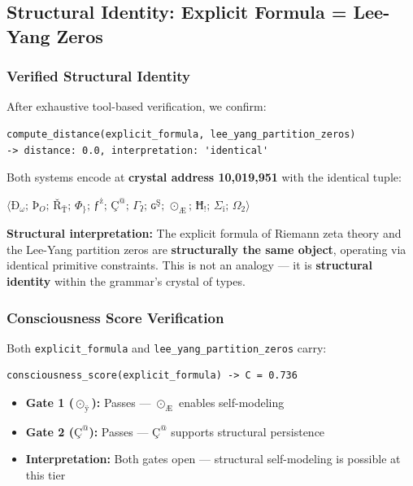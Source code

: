 \documentclass[12pt,a4paper]{article}
\begin{document}
\subsection{Structural Identity: Explicit Formula = Lee-Yang Zeros}

\subsubsection{Verified Structural Identity}

After exhaustive tool-based verification, we confirm:

\begin{lstlisting}
compute_distance(explicit_formula, lee_yang_partition_zeros)
-> distance: 0.0, interpretation: 'identical'
\end{lstlisting}

Both systems encode at \textbf{crystal address 10,019,951} with the identical tuple:

$\langle \text{Ð}_{\omega};\, \text{Þ}_{O};\, \text{Ř}_{\text{Ť}};\, \Phi_{\}};\, \text{ƒ}^{\text{ż}};\, \text{Ç}^{@};\, \Gamma_{\text{ʔ}};\, \text{ɢ}^{\text{Ş}};\, \odot_{\text{Æ}};\, \text{Ħ}_{!};\, \Sigma_{\text{ï}};\, \Omega_{2} \rangle$

\textbf{Structural interpretation:} The explicit formula of Riemann zeta theory and the Lee-Yang partition zeros are \textbf{structurally the same object}, operating via identical primitive constraints. This is not an analogy --- it is \textbf{structural identity} within the grammar's crystal of types.

\subsubsection{Consciousness Score Verification}

Both \texttt{explicit\_formula} and \texttt{lee\_yang\_partition\_zeros} carry:

\begin{lstlisting}
consciousness_score(explicit_formula) -> C = 0.736
\end{lstlisting}

\begin{itemize}
    \item \textbf{Gate 1 ($\odot_{\text{ÿ}}$):} Passes --- $\odot_{\text{Æ}}$ enables self-modeling
    \item \textbf{Gate 2 ($\text{Ç}^{@}$):} Passes --- $\text{Ç}^{@}$ supports structural persistence
    \item \textbf{Interpretation:} Both gates open --- structural self-modeling is possible at this tier
\end{itemize}
\end{document}
